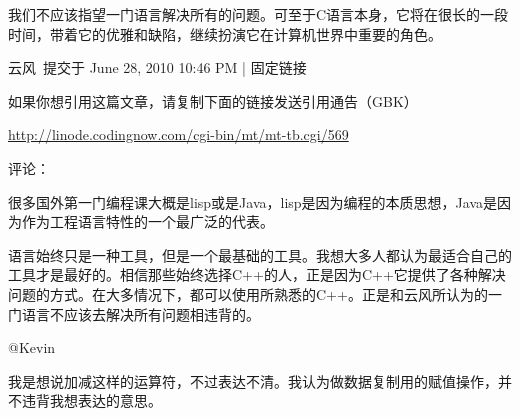 我们不应该指望一门语言解决所有的问题。可至于C语言本身，它将在很长的一段时间，带着它的优雅和缺陷，继续扮演它在计算机世界中重要的角色。

云风\  提交于 June 28, 2010 10:46 PM | 固定链接

如果你想引用这篇文章，请复制下面的链接发送引用通告（GBK）

\url{http://linode.codingnow.com/cgi-bin/mt/mt-tb.cgi/569}

评论：

很多国外第一门编程课大概是lisp或是Java，lisp是因为编程的本质思想，Java是因为作为工程语言特性的一个最广泛的代表。

语言始终只是一种工具，但是一个最基础的工具。我想大多人都认为最适合自己的工具才是最好的。相信那些始终选择C++的人，正是因为C++它提供了各种解决问题的方式。在大多情况下，都可以使用所熟悉的C++。正是和云风所认为的一门语言不应该去解决所有问题相违背的。

@Kevin

我是想说加减这样的运算符，不过表达不清。我认为做数据复制用的赋值操作，并不违背我想表达的意思。



\clearpage

